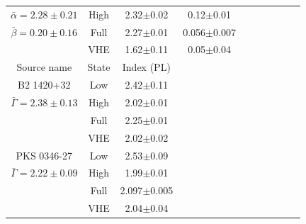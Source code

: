 \documentclass[11pt]{article}
\begin{document}
\begin{table}[htbp]
{\begin{tabular}{|c|c|c|c|c|c|c|c|c|c|}
        $\bar{\alpha}=2.28\pm0.21$ & High & 2.32$\pm$0.02 & 0.12$\pm$0.01 \\ %
        $\bar{\beta}=0.20\pm0.16$ & Full & 2.27$\pm$0.01 & 0.056$\pm$0.007 \\ %
         & VHE & 1.62$\pm$0.11 & 0.05$\pm$0.04 \\
    \hline
    \hline
    Source name & State & Index (PL) & \\
    \hline
       B2 1420+32 & Low & 2.42$\pm$0.11 & \\ %
        $\bar{\Gamma}=2.38\pm0.13$ & High & 2.02$\pm$0.01 & \\ %
         & Full & 2.25$\pm$0.01 & \\ %
         & VHE & 2.02$\pm$0.02 & \\
    \hline
       PKS 0346-27 & Low & 2.53$\pm$0.09 & \\ %
        $\bar{\Gamma}=2.22\pm0.09$ & High & 1.99$\pm$0.01 & \\ %
         & Full & 2.097$\pm$0.005 & \\ %
         & VHE & 2.04$\pm$0.04 & \\
    \hline
    \end{tabular}
}
\end{table}
\end{document}

